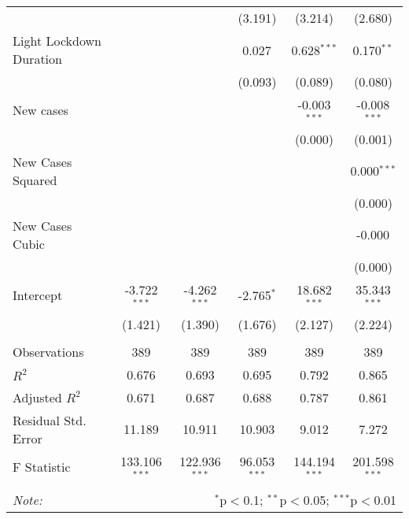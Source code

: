 \begin{tabular}{@{\extracolsep{5pt}}lccccc}
  & & & (3.191) & (3.214) & (2.680) \\
 Light Lockdown Duration & & & 0.027$^{}$ & 0.628$^{***}$ & 0.170$^{**}$ \\
  & & & (0.093) & (0.089) & (0.080) \\
 New cases & & & & -0.003$^{***}$ & -0.008$^{***}$ \\
  & & & & (0.000) & (0.001) \\
 New Cases Squared & & & & & 0.000$^{***}$ \\
  & & & & & (0.000) \\
 New Cases Cubic & & & & & -0.000$^{}$ \\
  & & & & & (0.000) \\
 Intercept & -3.722$^{***}$ & -4.262$^{***}$ & -2.765$^{*}$ & 18.682$^{***}$ & 35.343$^{***}$ \\
  & (1.421) & (1.390) & (1.676) & (2.127) & (2.224) \\
\hline \\[-1.8ex]
 Observations & 389 & 389 & 389 & 389 & 389 \\
 $R^2$ & 0.676 & 0.693 & 0.695 & 0.792 & 0.865 \\
 Adjusted $R^2$ & 0.671 & 0.687 & 0.688 & 0.787 & 0.861 \\
 Residual Std. Error & 11.189 & 10.911 & 10.903 & 9.012 & 7.272  \\
 F Statistic & 133.106$^{***}$  & 122.936$^{***}$  & 96.053$^{***}$  & 144.194$^{***}$  & 201.598$^{***}$  \\
\hline
\hline \\[-1.8ex]
\textit{Note:} & \multicolumn{5}{r}{$^{*}$p$<$0.1; $^{**}$p$<$0.05; $^{***}$p$<$0.01} \\
\end{tabular}

